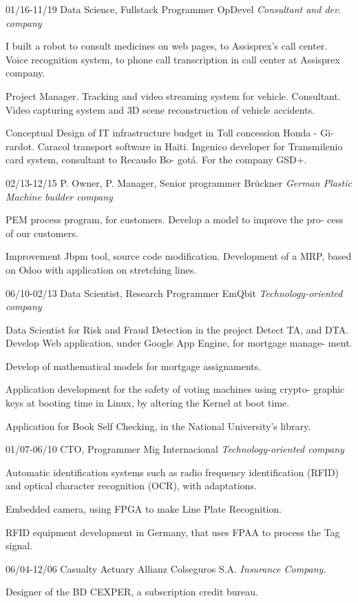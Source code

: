 \begin{entrylist}
  \entry
    {01/16-11/19}
    {Data Science, Fullstack Programmer}
    {OpDevel {\sl Consultant and dev. company}}
    {I built a robot to consult medicines on web pages, to Assisprex’s call center.
Voice recognition system, to phone call transcription in call center at Assisprex company.

Project Manager. Tracking and video streaming system for vehicle.
Consultant. Video capturing system and 3D scene reconstruction of vehicle
accidents.

Conceptual Design of IT infrastructure budget in Toll concession Honda - Gi-
rardot. Caracol transport software in Haiti. Ingenico developer for Transmilenio
	card system, consultant to Recaudo Bo-
        gotá. For the company GSD+.}

  \entry
	{02/13-12/15}
	{P. Owner, P. Manager, Senior programmer}
	{Brückner {\sl German Plastic Machine builder company}}
	{PEM process program, for customers. Develop a model to improve the pro-
cess of our customers.

Improvement Jbpm tool, source code modification.
	Development of a MRP, based on Odoo with application on stretching lines.}

  \entry
	{06/10-02/13}
	{Data Scientist, Research Programmer}
	{EmQbit {\sl Technology-oriented company}}
	{Data Scientist for Risk and Fraud Detection in the project Detect TA, and DTA.
Develop Web application, under Google App Engine, for mortgage manage-
ment.

Develop of mathematical models for mortgage assignaments.

Application development for the safety of voting machines using crypto-
graphic keys at booting time in Linux, by altering the Kernel at boot time.

	Application for Book Self Checking, in the National University’s library.}

  \entry
	{01/07-06/10}
	{CTO, Programmer}
	{Mig Internacional {\sl Technology-oriented company}}
	{Automatic identification systems such as radio frequency identification (RFID)
and optical character recognition (OCR), with adaptations.

Embedded camera, using FPGA to make Line Plate Recognition.

RFID equipment development in Germany, that uses FPAA to process the
	Tag signal.}

  \entry
	{06/04-12/06}
	{Casualty Actuary}
	{Allianz Colseguros S.A. {\sl Insurance Company.}}
	{Designer of the BD CEXPER, a subscription credit bureau.

}
\end{entrylist}
